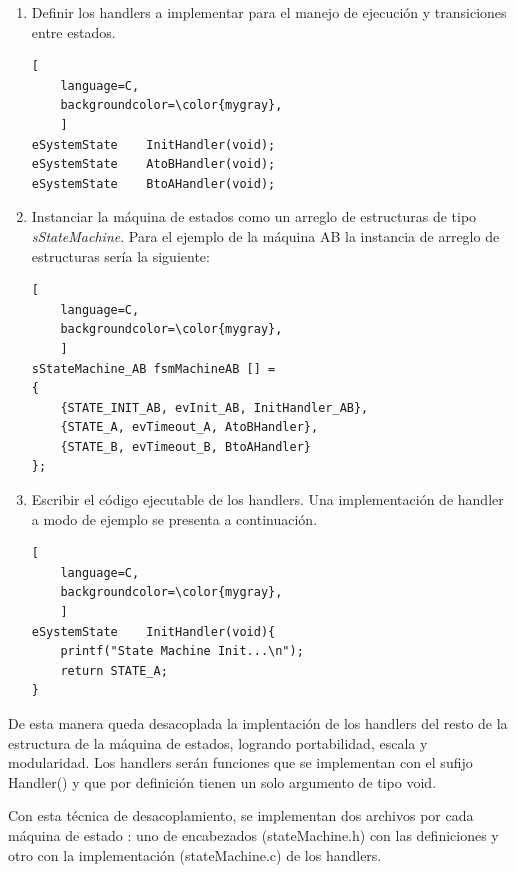 \begin{enumerate}
\begin{lstlisting}[
	language=C, 
	backgroundcolor=\color{mygray},
	]
typedef struct{

	eSystemState  	fsmState;
	eSystemEvent  	fsmEvent;
	pfEventHandler	fsmHandler;

} sStateMachine;
\end{lstlisting}

\item Definir los handlers a implementar para el manejo de ejecución y transiciones entre estados.

\begin{lstlisting}[
	language=C, 
	backgroundcolor=\color{mygray},
	]
eSystemState 	InitHandler(void);
eSystemState 	AtoBHandler(void);
eSystemState 	BtoAHandler(void);
\end{lstlisting}

\item Instanciar la máquina de estados como un arreglo de estructuras de tipo \textit{sStateMachine}. Para el ejemplo de la máquina AB la instancia de arreglo de estructuras sería la siguiente:

\begin{lstlisting}[
	language=C, 
	backgroundcolor=\color{mygray},
	]
sStateMachine_AB fsmMachineAB [] = 
{
	{STATE_INIT_AB, evInit_AB, InitHandler_AB},
	{STATE_A, evTimeout_A, AtoBHandler},
	{STATE_B, evTimeout_B, BtoAHandler}
};
\end{lstlisting}

\item Escribir el código ejecutable de los handlers. Una implementación de handler a modo de ejemplo se presenta a continuación.

\begin{lstlisting}[
	language=C, 
	backgroundcolor=\color{mygray},
	]
eSystemState 	InitHandler(void){ 
	printf("State Machine Init...\n");
	return STATE_A; 
}
\end{lstlisting}

\end{enumerate}

De esta manera queda desacoplada la implentación de los handlers del resto de la estructura de la máquina de estados, logrando portabilidad, escala y modularidad. Los handlers serán funciones que se implementan con el sufijo Handler() y que por definición tienen un solo argumento de tipo void.

Con esta técnica de desacoplamiento, se implementan dos archivos por cada máquina de estado : uno de encabezados (stateMachine.h) con las definiciones y otro con la implementación (stateMachine.c) de los handlers.





